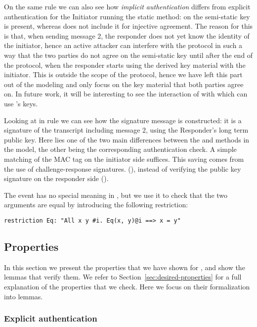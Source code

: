 On the same rule we can also see how \emph{implicit authentication}
differs from explicit authentication for the Initiator running the
static method: on  the semi-static key
\mGiy{} is present, whereas  does not include it
for injective agreement.
%
The reason for this is that, when sending message 2, the responder
does not yet know the identity of the initiator, hence an active
attacker can interfere with the protocol in such a way that the two
parties do not agree on the semi-static key
\mGiy{} until after the end of the protocol, when the responder
starts using the derived key material with the initiator.
%
This is outside the scope of the \mEdhoc{} protocol, hence we have left
this part out of the modeling and only focus on the key material that
both parties agree on.
%
In future work, it will be interesting to see the interaction of
\mEdhoc{} with \mOscore{} which can use \mEdhoc{}'s keys.

Looking at  in rule  we can
see how the signature message is constructed: it is a signature of the
transcript including message 2, using the Responder's long term public
key.
%
Here lies one of the two main differences between the \mStat{} and \mSig{} methods
in the model, the other being the corresponding authentication check.
A simple matching of the MAC tag on the initiator side suffices.
%
This saving comes from the use of challenge-response signatures.
%
(), instead of verifying the public key
signature on the responder side
%
().

The event  has no special meaning in \mTamarin{}, but we use it to check
that the two arguments are equal by introducing the following restriction:
\begin{lstlisting}
restriction Eq: "All x y #i. Eq(x, y)@i ==> x = y"
\end{lstlisting}

\spacehack
\subsection{Properties}
\label{sec:properties}
\fillhack
In this section we present the properties that we have shown for \mEdhoc, and
show the lemmas that verify them. We refer to
Section~\ref{sec:desired-properties} for a full explanation of the properties
that we check. Here we focus on their formalization into \mTamarin{} lemmas.

\spacehack
\subsubsection{Explicit authentication}

